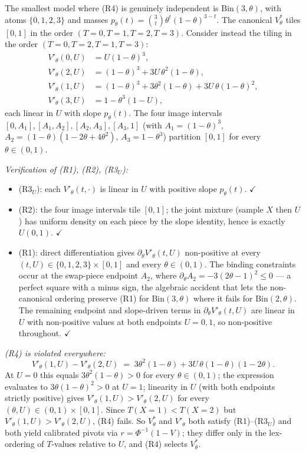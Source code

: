 \documentclass[11pt]{article}
\providecommand{\tightlist}{\setlength{\itemsep}{0pt}\setlength{\parskip}{0pt}}
\begin{document}
The smallest model where (R4) is genuinely independent is
\(\mathrm{Bin}(3, \theta)\), with atoms
\(\{0, 1, 2, 3\}\) and masses
\(p_\theta(t) = \binom{3}{t}\theta^t(1-\theta)^{3-t}\). The canonical
\(V^*_\theta\) tiles \([0, 1]\) in the order \((T = 0, T = 1, T = 2, T = 3)\).
Consider instead the tiling in the order \((T = 0, T = 2, T = 1, T = 3)\):
\[
\begin{aligned}
V'_\theta(0, U) &= U(1-\theta)^3, \\
V'_\theta(2, U) &= (1-\theta)^3 + 3 U\,\theta^2(1-\theta), \\
V'_\theta(1, U) &= (1-\theta)^3 + 3\theta^2(1-\theta) + 3U\,\theta(1-\theta)^2, \\
V'_\theta(3, U) &= 1 - \theta^3(1 - U),
\end{aligned}
\]
each linear in \(U\) with slope \(p_\theta(t)\). The four image
intervals \([0, A_1], [A_1, A_2], [A_2, A_3], [A_3, 1]\) (with
\(A_1 = (1-\theta)^3\), \(A_2 = (1-\theta)(1 - 2\theta + 4\theta^2)\),
\(A_3 = 1 - \theta^3\)) partition \([0, 1]\) for every
\(\theta \in (0, 1)\).

\emph{Verification of (R1), (R2), (R3\(_U\)):}
\begin{itemize}
\tightlist
\item (R3\(_U\)): each \(V'_\theta(t, \cdot)\) is linear in \(U\) with
  positive slope \(p_\theta(t)\). \(\checkmark\)
\item (R2): the four image intervals tile \([0, 1]\); the joint mixture
  (sample \(X\) then \(U\)) has uniform density on each piece by the
  slope identity, hence is exactly \(U(0, 1)\). \(\checkmark\)
\item (R1): direct differentiation gives
  \(\partial_\theta V'_\theta(t, U)\) non-positive at every
  \((t, U) \in \{0, 1, 2, 3\} \times [0, 1]\) and every
  \(\theta \in (0, 1)\). The binding constraints occur at the swap-piece
  endpoint \(A_2\), where
  \(\partial_\theta A_2 = -3(2\theta - 1)^2 \le 0\) --- a perfect square
  with a minus sign, the algebraic accident that lets the non-canonical
  ordering preserve (R1) for \(\mathrm{Bin}(3, \theta)\) where it fails
  for \(\mathrm{Bin}(2, \theta)\). The remaining endpoint and
  slope-driven terms in \(\partial_\theta V'_\theta(t, U)\) are linear
  in \(U\) with non-positive values at both endpoints \(U = 0, 1\), so
  non-positive throughout. \(\checkmark\)
\end{itemize}

\emph{(R4) is violated everywhere:}
\[
V'_\theta(1, U) - V'_\theta(2, U) \;=\; 3\theta^2(1-\theta) + 3U\,\theta(1-\theta)(1 - 2\theta).
\]
At \(U = 0\) this equals \(3\theta^2(1 - \theta) > 0\) for every
\(\theta \in (0, 1)\); the expression evaluates to
\(3\theta(1-\theta)^2 > 0\) at \(U = 1\); linearity in \(U\) (with both
endpoints strictly positive) gives \(V'_\theta(1, U) > V'_\theta(2, U)\)
for every \((\theta, U) \in (0, 1) \times [0, 1]\). Since
\(T(X = 1) < T(X = 2)\) but \(V'_\theta(1, U) > V'_\theta(2, U)\), (R4)
fails. So \(V^*_\theta\) and \(V'_\theta\) both satisfy (R1)--(R3\(_U\))
and both yield calibrated pivots via \(r = \Phi^{-1}(1 - V)\); they
differ only in the lex-ordering of \(T\)-values relative to \(U\), and
(R4) selects \(V^*_\theta\).
\end{document}
